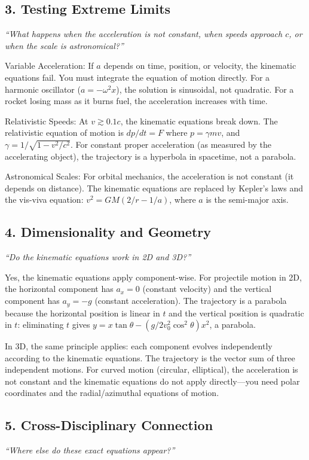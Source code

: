 \documentclass[11pt,openright]{book}
\begin{document}
\subsection*{3. Testing Extreme Limits}
\textit{``What happens when the acceleration is not constant, when speeds approach $c$, or when the scale is astronomical?''}

Variable Acceleration: If $a$ depends on time, position, or velocity, the kinematic equations fail. You must integrate the equation of motion directly. For a harmonic oscillator ($a = -\omega^2 x$), the solution is sinusoidal, not quadratic. For a rocket losing mass as it burns fuel, the acceleration increases with time.

Relativistic Speeds: At $v \gtrsim 0.1c$, the kinematic equations break down. The relativistic equation of motion is $dp/dt = F$ where $p = \gamma mv$, and $\gamma = 1/\sqrt{1 - v^2/c^2}$. For constant proper acceleration (as measured by the accelerating object), the trajectory is a hyperbola in spacetime, not a parabola.

Astronomical Scales: For orbital mechanics, the acceleration is not constant (it depends on distance). The kinematic equations are replaced by Kepler's laws and the vis-viva equation: $v^2 = GM(2/r - 1/a)$, where $a$ is the semi-major axis.

\subsection*{4. Dimensionality and Geometry}
\textit{``Do the kinematic equations work in 2D and 3D?''}

Yes, the kinematic equations apply component-wise. For projectile motion in 2D, the horizontal component has $a_x = 0$ (constant velocity) and the vertical component has $a_y = -g$ (constant acceleration). The trajectory is a parabola because the horizontal position is linear in $t$ and the vertical position is quadratic in $t$: eliminating $t$ gives $y = x\tan\theta - (g/2v_0^2\cos^2\theta)x^2$, a parabola.

In 3D, the same principle applies: each component evolves independently according to the kinematic equations. The trajectory is the vector sum of three independent motions. For curved motion (circular, elliptical), the acceleration is not constant and the kinematic equations do not apply directly---you need polar coordinates and the radial/azimuthal equations of motion.

\subsection*{5. Cross-Disciplinary Connection}
\textit{``Where else do these exact equations appear?''}
\end{document}
